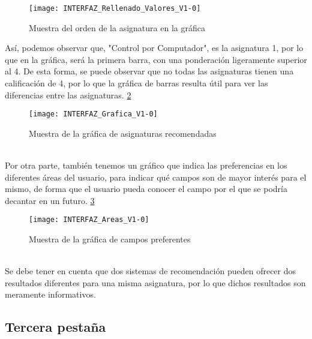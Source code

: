 \begin{figure}[h]
\centering
\texttt{[image: INTERFAZ\_Rellenado\_Valores\_V1-0]}
\caption{Muestra del orden de la asignatura en la gráfica}
\label{fig:E.2.10}
\end{figure}
Así, podemos observar que, "Control por Computador", es la asignatura 1, por lo que en la gráfica, será la primera barra, con una ponderación ligeramente superior al 4. De esta forma, se puede observar que no todas las asignaturas tienen una calificación de 4, por lo que la gráfica de barras resulta útil para ver las diferencias entre las asignaturas. \ref{fig:E.2.11} 
\begin{figure}[h]
\centering
\texttt{[image: INTERFAZ\_Grafica\_V1-0]}
\caption{Muestra de la gráfica de asignaturas recomendadas}
\label{fig:E.2.11}
\end{figure}
\\Por otra parte, también tenemos un gráfico que indica las preferencias en los diferentes áreas del usuario, para indicar qué campos son de mayor interés para el mismo, de forma que el usuario pueda conocer el campo por el que se podría decantar en un futuro. \ref{fig:E.2.12} 
\begin{figure}[h]
\centering
\texttt{[image: INTERFAZ\_Areas\_V1-0]}
\caption{Muestra de la gráfica de campos preferentes}
\label{fig:E.2.12}
\end{figure}
\\
Se debe tener en cuenta que dos sistemas de recomendación pueden ofrecer dos resultados diferentes para una misma asignatura, por lo que dichos resultados son meramente informativos. 
\subsection{Tercera pestaña}





